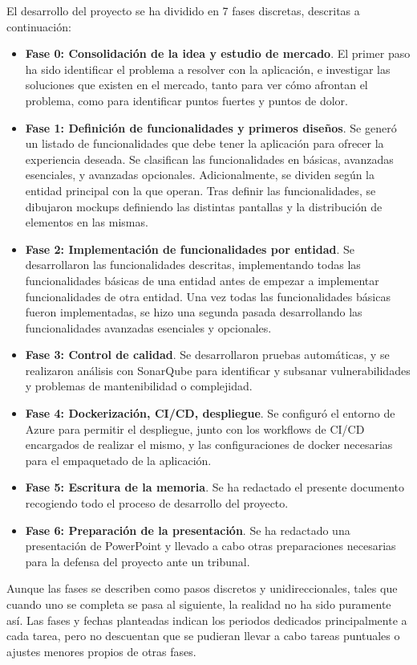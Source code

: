 El desarrollo del proyecto se ha dividido en 7 fases discretas, descritas a continuación:
\begin{itemize}
    \item \textbf{Fase 0: Consolidación de la idea y estudio de mercado}. El primer paso ha sido identificar el problema a resolver con la aplicación, e investigar las soluciones que existen en el mercado, tanto para ver cómo afrontan el problema, como para identificar puntos fuertes y puntos de dolor.
    \item \textbf{Fase 1: Definición de funcionalidades y primeros diseños}. Se generó un listado de funcionalidades que debe tener la aplicación para ofrecer la experiencia deseada. Se clasifican las funcionalidades en básicas, avanzadas esenciales, y avanzadas opcionales. Adicionalmente, se dividen según la entidad principal con la que operan. Tras definir las funcionalidades, se dibujaron mockups definiendo las distintas pantallas y la distribución de elementos en las mismas. 
    \item \textbf{Fase 2: Implementación de funcionalidades por entidad}. Se desarrollaron las funcionalidades descritas, implementando todas las funcionalidades básicas de una entidad antes de empezar a implementar funcionalidades de otra entidad. Una vez todas las funcionalidades básicas fueron implementadas, se hizo una segunda pasada desarrollando las funcionalidades avanzadas esenciales y opcionales.
    \item \textbf{Fase 3: Control de calidad}. Se desarrollaron pruebas automáticas, y se realizaron análisis con SonarQube para identificar y subsanar vulnerabilidades y problemas de mantenibilidad o complejidad.
    \item \textbf{Fase 4: Dockerización, CI/CD, despliegue}. Se configuró el entorno de Azure para permitir el despliegue, junto con los workflows de CI/CD encargados de realizar el mismo, y las configuraciones de docker necesarias para el empaquetado de la aplicación.
    \item \textbf{Fase 5: Escritura de la memoria}. Se ha redactado el presente documento recogiendo todo el proceso de desarrollo del proyecto.
    \item \textbf{Fase 6: Preparación de la presentación}. Se ha redactado una presentación de PowerPoint y llevado a cabo otras preparaciones necesarias para la defensa del proyecto ante un tribunal.
\end{itemize}

Aunque las fases se describen como pasos discretos y unidireccionales, tales que cuando uno se completa se pasa al siguiente, la realidad no ha sido puramente así. Las fases y fechas planteadas indican los periodos dedicados principalmente a cada tarea, pero no descuentan que se pudieran llevar a cabo tareas puntuales o ajustes menores propios de otras fases. 

